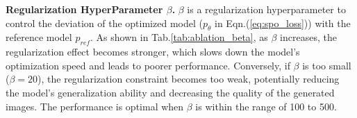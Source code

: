 \textbf{Regularization HyperParameter $\beta$.} $\beta$ is a regularization hyperparameter to control the deviation of the optimized model ($p_\theta$ in Eqn.\;(\ref{eq:spo_loss})) with the reference model $p_{ref}$. As shown in Tab.\;\ref{tab:ablation_beta}, as $\beta$ increases, the regularization effect becomes stronger, which slows down the model's optimization speed and leads to poorer performance. Conversely, if $\beta$ is too small ($\beta=20$), the regularization constraint becomes too weak, potentially reducing the model's generalization ability and decreasing the quality of the generated images. The performance is optimal when $\beta$ is within the range of 100 to 500.



\begin{table}[ht]
    \centering
    \vspace{-2.5mm}
    \caption{Ablataion results on the dynamic threshold strategies.}
    \vskip 0.05in
    \label{tab:ablation_dyn_th}
    \footnotesize
\end{table}

